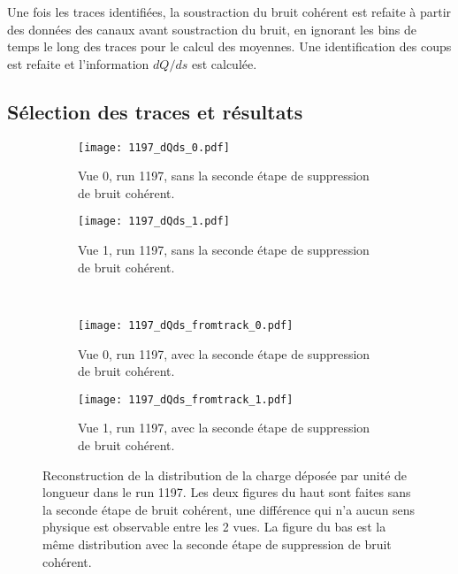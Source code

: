       Une fois les traces identifiées, la soustraction du bruit cohérent est refaite à partir des données des canaux avant soustraction du bruit, en ignorant les bins de temps le long des traces pour le calcul des moyennes. Une identification des coups est refaite et l'information $dQ/ds$ est calculée.

    \subsection{Sélection des traces et résultats}

      \begin{figure}[htbp]
        \centering
        \begin{subfigure}[t]{0.48\textwidth}
          \centering
          \texttt{[image: 1197\_dQds\_0.pdf]}
          \caption{Vue 0, run 1197, sans la seconde étape de suppression de bruit cohérent.}
        \end{subfigure}\hfill
        \begin{subfigure}[t]{0.48\textwidth}
          \centering
          \texttt{[image: 1197\_dQds\_1.pdf]}
          \caption{Vue 1,  run 1197, sans la seconde étape de suppression de bruit cohérent.}
        \end{subfigure}\\
        \begin{subfigure}[t]{0.48\textwidth}
          \centering
          \texttt{[image: 1197\_dQds\_fromtrack\_0.pdf]}
          \caption{Vue 0, run 1197, avec la seconde étape de suppression de bruit cohérent.}
        \end{subfigure}\hfill
        \begin{subfigure}[t]{0.48\textwidth}
          \centering
          \texttt{[image: 1197\_dQds\_fromtrack\_1.pdf]}
          \caption{Vue 1, run 1197, avec la seconde étape de suppression de bruit cohérent.}
        \end{subfigure}
        \caption[Reconstruction de la distribution de la charge déposée par unité de longueur dans le run 1197]{\label{fig::dqds_1197_Rawdatasoft}Reconstruction de la distribution de la charge déposée par unité de longueur dans le run 1197. Les deux figures du haut sont faites sans la seconde étape de bruit cohérent, une différence qui n'a aucun sens physique est observable entre les 2 vues. La figure du bas est la même distribution avec la seconde étape de suppression de bruit cohérent.}
      \end{figure}



